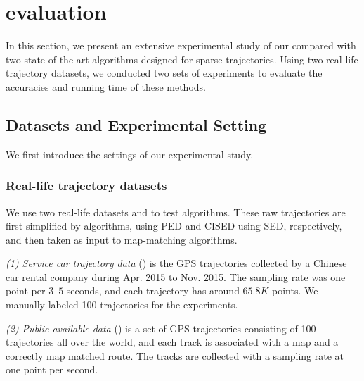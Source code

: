 \section{evaluation}
\label{sec-exp}

In this section, we present an extensive experimental study of our \stmm compared with two state-of-the-art algorithms designed for sparse trajectories. %
Using two real-life trajectory datasets, we conducted two sets of experiments
to evaluate the accuracies and running time of these methods.
%

\subsection{Datasets and Experimental Setting}
We first introduce the settings of our experimental study.

\subsubsection{Real-life trajectory datasets}
We use two real-life datasets \sercar and \pubdata to test algorithms.
These raw trajectories are first simplified by algorithms,  using PED and CISED \cite{Lin:Cised} using SED, respectively, and then taken as input to map-matching algorithms.

\vspace{0.5ex}
\ni \emph{(1) Service car trajectory data} (\sercar) is the GPS trajectories
collected by a Chinese car rental company during Apr. 2015 to Nov. 2015. The
sampling rate was one point per $3$--$5$ seconds, and
each trajectory has around $65.8K$ points. We manually labeled 100 trajectories
for the experiments.

\vspace{0.5ex}
\ni \emph{(2) Public available data} (\pubdata) \cite{pubdata} is a set of GPS trajectories
consisting of 100 trajectories all over the world, and each track is associated
with  a map and a correctly map matched route.%
The tracks are collected with a sampling rate at one point per second.


